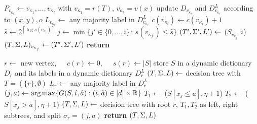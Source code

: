 \begin{algorithm}[t]%
\caption{\algo.\AlgoUpdate} \label{alg:fullydyndec}
\begin{algorithmic}[1]
\State $P_{v_{\kappa_\ell}} \gets v_{\kappa_1},\dots, v_{\kappa_\ell}$ with  $v_{\kappa_1}=r(T)$, $v_{\kappa_\ell}=v(x)$
\State update $D_{v_{\kappa_\ell}}$ and $D^L_{v_{\kappa_\ell}}$ according to $(x,y),o$ \label{line:update_dicts}
\State $L_{v_{\kappa_\ell}} \gets$ any majority label in $D^L_{v_{\kappa_\ell}}$
\State $c({v_{\kappa_i}}) \gets c(v_{\kappa_i})+1$ \label{line:inc_c}
\label{line:if_c_eps_s}
\State $\hat{s} \gets 2^{\left\lceil \log s ( v_{\kappa_i})  \right\rceil }$ %
\label{line:hat_s}
\State $j \gets \min \{ j' \in \{0,\ldots,i\} \,:\, s(v_{\kappa_{j'}}) \leq \hat{s} \}$ \label{line:min_j}
\State $(T',\Sigma',L') \gets$ \AlgoBuild($S_{v_{\kappa_j}},i$)
\State $(T,\Sigma,L)_{v_{\kappa_j}} \gets (T',\Sigma',L')$
\State \textbf{return}
\EndIf
\EndFor
\EndProcedure
\end{algorithmic}
\end{algorithm}

\begin{algorithm}[t]%
\caption{\algo.\AlgoBuild} \label{alg:build}
\begin{algorithmic}[1]
\State $r \gets$ new vertex,~~~$c(r) \gets 0$,~~~$s(r) \gets |S|$ %
\label{line:creation}\label{line:sv}
 \label{line:if_split}
\State store $S$ in a dynamic dictionary $D_r$
\State and its labels in a dynamic dictionary $D^L_r$
\State $(T,\Sigma,L) \gets$ decision tree with $T=(\{r\},\emptyset)$
\State $L_r \gets $ any majority label in $D^L_r$
\State $(j,a) \gets \arg \max \{G(S,\hat \iota, \hat a) : (\hat \iota, \hat a) \in [d] \times \mathbb{R}\}$
\State $T_1 \gets $ \AlgoBuild($S[x_j \le a], \eta + 1$)
\State $T_2 \gets $ \AlgoBuild($S[x_j > a], \eta + 1$)
\State $(T,\Sigma,L) \gets$ decision tree with root $r$, $T_1,T_2$ as left, right subtrees, and split $\sigma_r=(j,a)$
\EndIf
\State \textbf{return} $(T,\Sigma,L)$
\EndProcedure
\end{algorithmic}
\end{algorithm}

